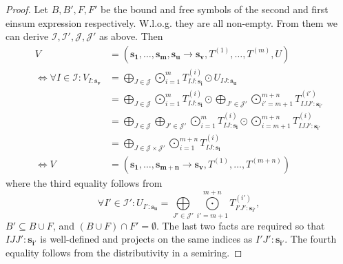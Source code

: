 \begin{proof}
    Let $B, B', F, F'$ be the bound and free symbols of the second and first einsum expression respectively.
    W.l.o.g. they are all non-empty.
    From them we can derive $\mathcal{I}, \mathcal{I}', \mathcal{J}, \mathcal{J}'$ as above.
    Then
    \begin{align*}
        V                                               & = (\bm{s_1},\dots,\bm{s_m}, \bm{s_u} \rightarrow \bm{s_v}, T^{(1)},\dots,T^{(m)}, U)                                                                                                                   \\
        \iff \forall I \in \mathcal{I}: V_{I: \bm{s_v}} & = \bigoplus\limits_{J \in \mathcal{J}} \bigodot\limits_{i = 1}^{m} T^{(i)}_{IJ:\bm{s_i}} \odot U_{IJ:\bm{s_u}}                                                                                         \\
                                                        & = \bigoplus\limits_{J \in \mathcal{J}} \bigodot\limits_{i = 1}^{m} T^{(i)}_{IJ:\bm{s_i}} \odot \bigoplus\limits_{J' \in \mathcal{J}'} \bigodot\limits_{i' = m + 1}^{m + n} T^{(i')}_{IJJ':\bm{s_{i'}}} \\
                                                        & = \bigoplus\limits_{J \in \mathcal{J}} \bigoplus\limits_{J' \in \mathcal{J}'} \bigodot\limits_{i = 1}^{m} T^{(i)}_{IJ:\bm{s_i}} \odot \bigodot\limits_{i = m + 1}^{m + n} T^{(i)}_{IJJ':\bm{s_{i'}}}   \\
                                                        & = \bigoplus\limits_{J \in \mathcal{J} \times \mathcal{J}'} \bigodot\limits_{i = 1}^{m + n} T^{(i)}_{IJ:\bm{s_i}}                                                                                       \\
        \iff V                                          & = (\bm{s_1}, \dots, \bm{s_{m + n}} \rightarrow \bm{s_v}, T^{(1)}, \dots, T^{(m + n)})
    \end{align*}
    where the third equality follows from
    $$\forall I' \in \mathcal{I}': U_{I': \bm{s_u}} = \bigoplus\limits_{J' \in \mathcal{J}'} \bigodot\limits_{i' = m + 1}^{m + n} T^{(i')}_{I'J':\bm{s_{i'}}},$$
    $B' \subseteq B \cup F$, and $(B \cup F) \cap F' = \emptyset$. The last two facts are required so that $IJJ':\bm{s_{i'}}$ is well-defined and projects on the same indices as $I'J':\bm{s_{i'}}$.
    The fourth equality follows from the distributivity in a semiring.
\end{proof}

